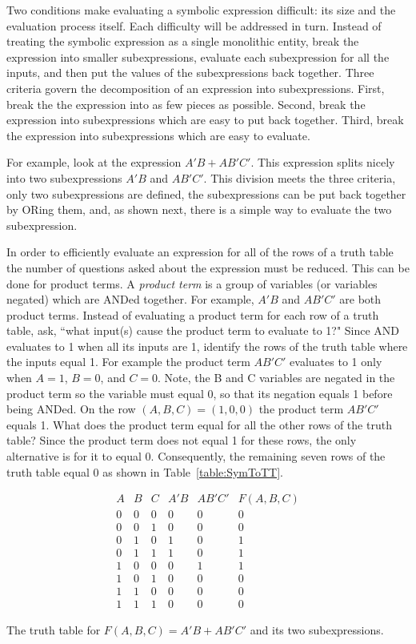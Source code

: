 Two conditions make evaluating a symbolic expression
difficult: its size and the evaluation process itself.  Each difficulty
will be addressed in turn.  Instead of treating the symbolic expression 
as a single monolithic entity, break the expression into smaller
subexpressions, evaluate each subexpression for all the inputs, and 
then put the values of the subexpressions back together.  Three criteria govern
the decomposition of an expression into subexpressions. First, break the 
the expression into as few pieces as possible.  Second, break the expression 
into subexpressions which are easy to put back together.  Third, break the
expression into subexpressions which are easy to evaluate.  

For example, look at the expression $A'B + AB'C'$.  This expression splits nicely
into two subexpressions $A'B$ and  $AB'C'$.  This division meets the three
criteria, only two subexpressions are defined, the subexpressions can be put
back together by ORing them, and, as shown next, there is a simple 
way to evaluate the two subexpression.

In order to efficiently evaluate an expression for all of the rows of a 
truth table the number of questions asked about the expression must
be reduced.  This can be done for product terms.
A \textit{product term}  is a group of variables 
(or variables negated) which are ANDed together.   For example, $A'B$ and  
$AB'C'$ are both product terms.  Instead of evaluating a product term for each
row of a truth table, ask, ``what input(s) cause the product term to 
evaluate to 1?"  Since AND evaluates to 1 when all its inputs are 1, 
identify the rows of the truth table where the inputs equal 1.
For example the product term $AB'C'$ evaluates to 1 only when $A=1$, $B=0$, and 
$C=0$.  Note, the B and C variables are negated in the product term so the 
variable must equal 0, so that its negation equals 1 before being ANDed.  
On the row $(A,B,C) = (1,0,0)$ the product term $AB'C'$ equals 1.  What
does the product term equal for all the other rows of the truth table?  
Since the product term does not equal 1 for these rows, the only alternative
is for it to equal 0.  Consequently, the remaining seven rows of the truth 
table equal 0 as shown in Table~\ref{table:SymToTT}.

\begin{table}
$$\begin{array}{c|c|c||c|c||c}
A & B & C & A'B & AB'C' & F(A,B,C) \\ \hline \hline
0 & 0 & 0 & 0  &  0 &  0  \\ \hline
0 & 0 & 1 & 0  &  0 &  0  \\ \hline
0 & 1 & 0 & 1  &  0 &  1  \\ \hline
0 & 1 & 1 & 1  &  0 &  1  \\ \hline
1 & 0 & 0 & 0  &  1 &  1  \\ \hline
1 & 0 & 1 & 0  &  0 &  0  \\ \hline
1 & 1 & 0 & 0  &  0 &  0  \\ \hline
1 & 1 & 1 & 0  &  0 &  0 
\end{array} $$
\caption{The truth table for $F(A,B,C) = A'B + AB'C'$ and its 
two subexpressions.}
\label{table:SymToTT}
\end{table}

